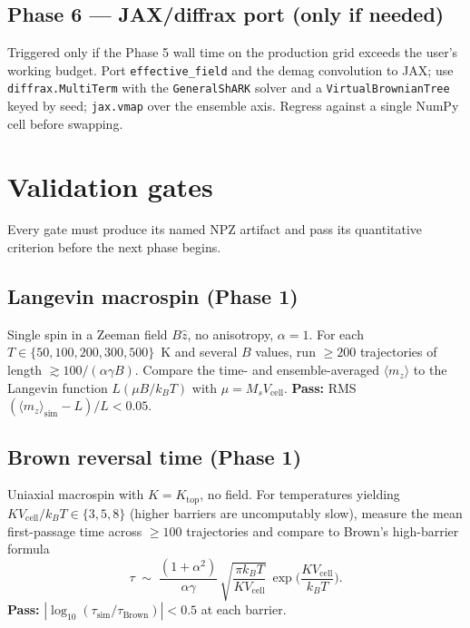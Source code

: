\documentclass[11pt,a4paper]{article}
\newcommand{\Ms}{M_s}
\newcommand{\Vcell}{V_{\text{cell}}}
\newcommand{\kB}{k_B}
\begin{document}
\subsection{Phase 6 --- JAX/diffrax port (only if needed)}

Triggered only if the Phase 5 wall time on the production grid
exceeds the user's working budget. Port \texttt{effective\_field}
and the demag convolution to JAX; use \texttt{diffrax.MultiTerm}
with the \texttt{GeneralShARK} solver and a
\texttt{VirtualBrownianTree} keyed by seed; \texttt{jax.vmap} over
the ensemble axis. Regress against a single NumPy cell before
swapping.

\section{Validation gates}\label{sec:val}

Every gate must produce its named NPZ artifact and pass its
quantitative criterion before the next phase begins.

\subsection{Langevin macrospin (Phase 1)}

Single spin in a Zeeman field $B \hat{z}$, no anisotropy, $\alpha=1$.
For each $T \in \{50, 100, 200, 300, 500\}$~K and several $B$ values,
run $\geq 200$ trajectories of length
$\gtrsim 100 / (\alpha \gamma B)$. Compare the time- and
ensemble-averaged $\langle m_z \rangle$ to the Langevin function
$L(\mu B / \kB T)$ with $\mu = \Ms \Vcell$.
\textbf{Pass:} RMS$(\langle m_z\rangle_{\text{sim}} - L)/L < 0.05$.

\subsection{Brown reversal time (Phase 1)}

Uniaxial macrospin with $K = K_{\text{top}}$, no field. For
temperatures yielding $K\Vcell/\kB T \in \{3, 5, 8\}$ (higher
barriers are uncomputably slow), measure the mean first-passage time
across $\geq 100$ trajectories and compare to Brown's high-barrier
formula
%
\begin{equation}
\tau \;\sim\; \frac{(1+\alpha^2)}{\alpha\gamma}\,
\sqrt{\frac{\pi \kB T}{K \Vcell}}\,
\exp\!\Big(\frac{K \Vcell}{\kB T}\Big).
\end{equation}
%
\textbf{Pass:} $|\log_{10}(\tau_{\text{sim}} / \tau_{\text{Brown}})|
< 0.5$ at each barrier.
\end{document}
